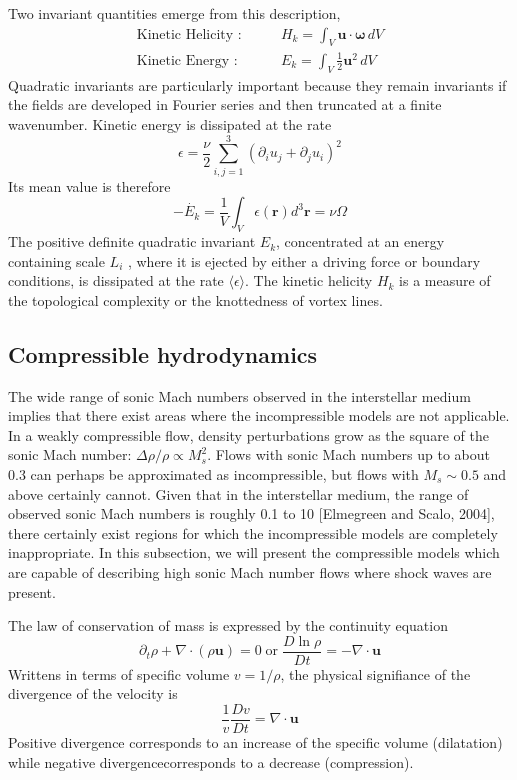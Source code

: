 Two invariant quantities emerge from this description, 
\begin{align}
    \text{Kinetic Helicity :}\quad\quad & H_k=\int_V\mathbf{u}\cdot\boldsymbol{\omega}\,dV\\
    \text{Kinetic Energy :}\quad\quad & E_k=\int_V\frac{1}{2}\mathbf{u}^2\,dV
\end{align}
Quadratic invariants are particularly important because they remain
invariants if the fields are developed in Fourier series and then truncated at a finite wavenumber.
Kinetic energy is dissipated at the rate
\begin{equation}
    \epsilon=\frac{\nu}{2}\sum_{i,j=1}^3(\partial_iu_j+\partial_ju_i)^2
\end{equation}
Its mean value is therefore
\begin{equation}
    -\dot{E_k}=\frac{1}{V}\int_V\epsilon(\mathbf{r})d^3\mathbf{r}=\nu\Omega
\end{equation}
The positive definite quadratic invariant $E_k$, concentrated at an energy containing scale $L_i$ , where it is ejected by either a driving force or boundary conditions, is dissipated at the rate $\langle\epsilon\rangle$. The kinetic helicity $H_k$ is a measure of the topological complexity or the knottedness of vortex lines. 
\subsection{Compressible hydrodynamics}
The wide range of sonic Mach numbers observed in the interstellar medium implies that there exist areas where the incompressible models are not applicable. In a weakly compressible flow, density perturbations grow as the square of the sonic Mach number: $\Delta\rho/\rho\propto M_s^2$. Flows with sonic Mach numbers up to about 0.3 can perhaps be approximated as incompressible, but flows with $M_s \sim 0.5$ and above certainly cannot. Given that in the interstellar medium, the range of observed sonic Mach numbers is roughly 0.1 to 10 [Elmegreen and Scalo, 2004], there certainly exist regions for which the incompressible models are completely inappropriate. 
In this subsection, we will present the compressible models which are capable of describing high sonic Mach number flows where shock waves are present.

The law of conservation of mass is expressed by the continuity equation 
\begin{equation}
    \partial_t\rho+\nabla\cdot(\rho\mathbf{u})=0\;\text{or}\;\frac{D\ln\rho}{Dt}=-\nabla\cdot\mathbf{u}
\end{equation}
Writtens in terms of specific volume $v=1/\rho$, the physical signifiance of the divergence of the velocity is 
\begin{equation}
    \frac{1}{v}\frac{Dv}{Dt}=\nabla\cdot\mathbf{u}
\end{equation}
Positive divergence corresponds to an increase of the specific volume (dilatation) while negative divergencecorresponds to a decrease (compression).

